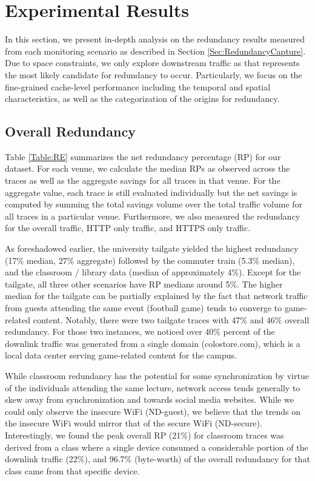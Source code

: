 \documentclass{sig-alternate}
\begin{document}
\section{Experimental Results}

In this section, we present in-depth analysis on the redundancy results measured from each monitoring scenario as described in Section \ref{Sec:RedundancyCapture}. Due to space constraints, we only explore downstream traffic as that represents the most likely candidate for redundancy to occur. Particularly, we focus on the fine-grained cache-level performance including the temporal and spatial characteristics, as well as the categorization of the origins for redundancy. 

\subsection{Overall Redundancy}

Table \ref{Table:RE} summarizes the net redundancy percentage (RP) for our dataset. For each venue, we calculate the median RPs as observed across the traces as well as the aggregate savings for all traces in that venue. For the aggregate value, each trace is still evaluated individually but the net savings is computed by summing the total savings volume over the total traffic volume for all traces in a particular venue. Furthermore, we also measured the redundancy for the overall traffic, HTTP only traffic, and HTTPS only traffic. 

As foreshadowed earlier, the university tailgate yielded the highest redundancy (17\% median, 27\% aggregate) followed by the commuter train (5.3\% median), and the classroom / library data (median of approximately 4\%). Except for the tailgate, all three other scenarios have RP medians around 5\%. The higher median for the tailgate can be partially explained by the fact that network traffic from guests attending the same event (football game) tends to converge to game-related content. Notably, there were two tailgate traces with 47\% and 46\% overall redundancy. For those two instances, we noticed over 40\% percent of the downlink traffic was generated from a single domain (colostore.com), which is a local data center serving game-related content for the campus. 

While classroom redundancy has the potential for some synchronization by virtue of the individuals attending the same lecture, network access tends generally to skew away from synchronization and towards social media websites. While we could only observe the insecure WiFi (ND-guest), we believe that the trends on the insecure WiFi would mirror that of the secure WiFi (ND-secure). Interestingly, we found the peak overall RP (21\%) for classroom traces was derived from a class where a single device consumed a considerable portion of the downlink traffic (22\%), and 96.7\% (byte-worth) of the overall redundancy for that class came from that specific device. 
   
\end{document}
